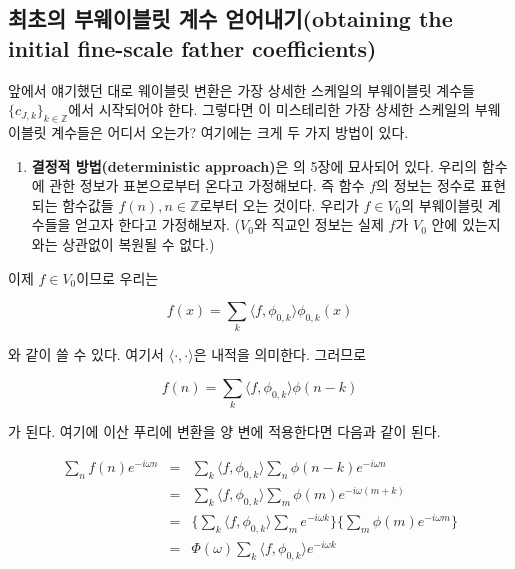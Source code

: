 \documentclass[b5paper,]{scrbook}
\providecommand{\tightlist}{%
  \setlength{\itemsep}{0pt}\setlength{\parskip}{0pt}}
\theoremstyle{plain}
\theoremstyle{definition}
\numberwithin{equation}{section}
\begin{document}
\hypertarget{---obtaining-the-initial-fine-scale-father-coefficients}{%
\subsection{최초의 부웨이블릿 계수 얻어내기(obtaining the initial fine-scale father coefficients)}\label{---obtaining-the-initial-fine-scale-father-coefficients}}

앞에서 얘기했던 대로 웨이블릿 변환은 가장 상세한 스케일의 부웨이블릿 계수들 \(\{c_{J,k}\}_{k\in\mathbb{Z}}\)에서 시작되어야 한다. 그렇다면 이 미스테리한 가장 상세한 스케일의 부웨이블릿 계수들은 어디서 오는가? 여기에는 크게 두 가지 방법이 있다.

\begin{enumerate}
\def\labelenumi{\arabic{enumi}.}
\tightlist
\item
  \textbf{결정적 방법(deterministic approach)}은 \citep{Daubechies1992}의 5장에 묘사되어 있다. 우리의 함수에 관한 정보가 표본으로부터 온다고 가정해보다. 즉 함수 \(f\)의 정보는 정수로 표현되는 함수값들 \(f(n),n\in\mathbb{Z}\)로부터 오는 것이다. 우리가 \(f\in V_{0}\)의 부웨이블릿 계수들을 얻고자 한다고 가정해보자. (\(V_{0}\)와 직교인 정보는 실제 \(f\)가 \(V_{0}\) 안에 있는지와는 상관없이 복원될 수 없다.)
\end{enumerate}

이제 \(f\in V_{0}\)이므로 우리는

\begin{equation}
f(x)=\sum_{k}\langle f, \phi_{0,k} \rangle \phi_{0,k}(x)
\end{equation}

와 같이 쓸 수 있다. 여기서 \(\langle\cdot , \cdot\rangle\)은 내적을 의미한다. 그러므로

\begin{equation}
f(n)=\sum_{k}\langle f, \phi_{0,k} \rangle \phi(n-k)
\end{equation}

가 된다. 여기에 이산 푸리에 변환을 양 변에 적용한다면 다음과 같이 된다.

\begin{eqnarray}
\sum_{n}f(n)e^{-i\omega n}&=&\sum_{k}\langle f, \phi_{0,k} \rangle \sum_{n}\phi(n-k)e^{-i\omega n}\nonumber\\
&=&\sum_{k}\langle f, \phi_{0,k} \rangle \sum_{m}\phi(m)e^{-i\omega (m+k)}\nonumber\\
&=&\{ \sum_{k}\langle f, \phi_{0,k} \rangle \sum_{m}e^{-i\omega k}  \}\{ \sum_{m} \phi(m) e^{-i\omega m}\}\\
&=&\Phi(\omega)\sum_{k}\langle f, \phi_{0,k} \rangle e^{-i\omega k}
\label{eq:initialfather1}
\end{eqnarray}
\end{document}
